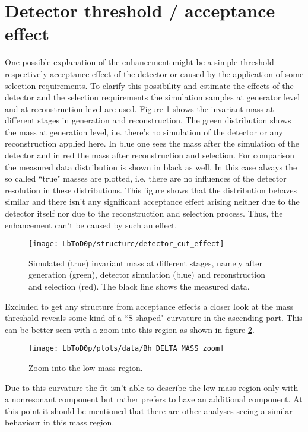 \section{Detector threshold / acceptance effect}
One possible explanation of the enhancement might be a simple threshold respectively acceptance effect of the detector or caused by the application of some selection requirements.
To clarify this possibility and estimate the effects of the detector and the selection requirements the simulation samples at generator level and at reconstruction level are used.
Figure \ref{fig:detector_cut_effect} shows the invariant \Dz\proton mass at different stages in generation and reconstruction.
The green distribution shows the \Dz\proton mass at generation level, i.e. there's no simulation of the detector or any reconstruction applied here.
In blue one sees the \Dz\proton mass after the simulation of the detector and in red the mass after reconstruction and selection.
For comparison the measured data distribution is shown in black as well.
In this case always the so called ``true" masses are plotted, i.e. there are no influences of the detector resolution in these distributions.
This figure shows that the distribution behaves similar and there isn't any significant acceptance effect arising neither due to the detector itself nor due to the reconstruction and selection process. 
Thus, the enhancement can't be caused by such an effect.
\begin{figure}[hptb]
	\centering
	\texttt{[image: LbToD0p/structure/detector\_cut\_effect]}
	\caption{Simulated (true) invariant \Dz\proton mass at different stages, namely after generation (green), detector simulation (blue) and reconstruction and selection (red). The black line shows the measured data.}
	\label{fig:detector_cut_effect}
\end{figure}

Excluded to get any structure from acceptance effects a closer look at the \Dz\proton mass threshold reveals some kind of a ``S-shaped" curvature in the ascending part.
This can be better seen with a zoom into this region as shown in figure \ref{fig:mD0p_zoom}.
\begin{figure}[hptb]
	\centering
	\texttt{[image: LbToD0p/plots/data/Bh\_DELTA\_MASS\_zoom]}
	\caption{Zoom into the low \Dz\proton mass region.}
	\label{fig:mD0p_zoom}
\end{figure}

Due to this curvature the fit isn't able to describe the low \Dz\proton mass region only with a nonresonant component but rather prefers to have an additional component. 
At this point it should be mentioned that there are other analyses seeing a similar behaviour in this \Dz\proton mass region.

